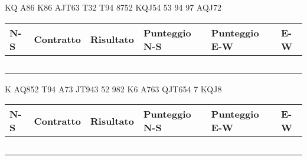 \documentclass[a4paper,italian,12pt]{article}
\begin{document}
\medskip

\begin{tcolorbox}
\begin{minipage}{.3\textwidth}
\newgame
{}
     {KQ} {A86} {K86}
     {AJT63} {T32} {T94}
     {8752} {KQJ54} {53}
     {94} {97} {AQJ72}


    \hspace{-.2cm}\showAll
\end{minipage}
\begin{minipage}{.7\textwidth}

\renewcommand{\arraystretch}{2}
\begin{tabular}{|l|l|l|l|l|l|}
\hline
N-S & Contratto\hspace{1.5cm} & Risultato& Punteggio N-S & Punteggio E-W & E-W\\\hline
  &&&&&\\\hline
   &&&&&\\\hline
    &&&&&\\\hline
     &&&&&\\\hline
          &&&&&\\\hline
\end{tabular}
\end{minipage}
\end{tcolorbox}

\medskip

\begin{tcolorbox}
\begin{minipage}{.3\textwidth}
\newgame
{}
     {K} {AQ852} {T94}
     {A73} {JT943} {52}
     {982} {K6} {A763}
     {QJT654} {7} {KQJ8}

    \hspace{-.2cm}\showAll
\end{minipage}
\begin{minipage}{.7\textwidth}

\renewcommand{\arraystretch}{2}
\begin{tabular}{|l|l|l|l|l|l|}
\hline
N-S & Contratto\hspace{1.5cm} & Risultato& Punteggio N-S & Punteggio E-W & E-W\\\hline
  &&&&&\\\hline
   &&&&&\\\hline
    &&&&&\\\hline
     &&&&&\\\hline
          &&&&&\\\hline
\end{tabular}
\end{minipage}
\end{tcolorbox}
\end{document}
